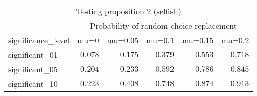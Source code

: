 \begin{longtable}{lrrrrr}
\toprule
\multicolumn{6}{c}{Testing proposition 2 (selfish)} \\ 
\cmidrule(lr){1-6}
 & \multicolumn{5}{c}{Probability of random choice replacement} \\ 
\cmidrule(lr){2-6}
significance\_level & mu=0 & mu=0.05 & mu=0.1 & mu=0.15 & mu=0.2 \\ 
\midrule\addlinespace[2.5pt]
significant\_01 & $0.078$ & $0.175$ & $0.379$ & $0.553$ & $0.718$ \\ 
significant\_05 & $0.204$ & $0.233$ & $0.592$ & $0.786$ & $0.845$ \\ 
significant\_10 & $0.223$ & $0.408$ & $0.748$ & $0.874$ & $0.913$ \\ 
\bottomrule
\end{longtable}

